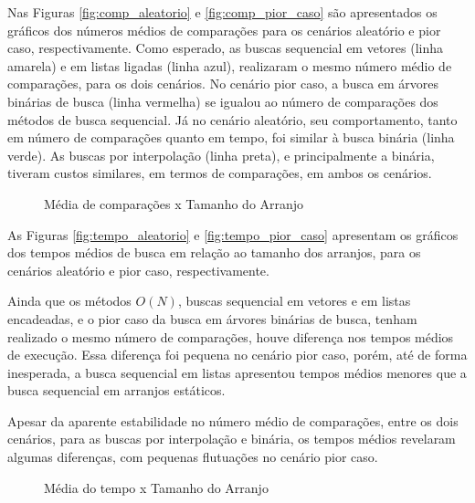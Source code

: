 \documentclass[12pt]{article}
\begin{document}
Nas Figuras \ref{fig:comp_aleatorio} e \ref{fig:comp_pior_caso} são apresentados os gráficos dos números médios de comparações para os cenários aleatório e pior caso, respectivamente. 
Como esperado, as buscas sequencial em vetores (linha amarela) e em listas ligadas (linha azul), realizaram o mesmo número médio de comparações, para os dois cenários.
No cenário pior caso, a busca em árvores binárias de busca (linha vermelha) se igualou ao número de comparações dos métodos de busca sequencial. Já no cenário aleatório, seu comportamento, tanto em número de comparações quanto em tempo, foi similar à busca binária (linha verde).
As buscas por interpolação (linha preta), e principalmente a binária, tiveram custos similares, em termos de comparações, em ambos os cenários.
\begin{figure}[h]
    \caption{Média de comparações x Tamanho do Arranjo}
    \label{fig:comp}
\end{figure}

As Figuras \ref{fig:tempo_aleatorio} e \ref{fig:tempo_pior_caso} apresentam os gráficos dos tempos médios de busca em relação ao tamanho dos arranjos, para os cenários aleatório e pior caso, respectivamente.

Ainda que os métodos $O(N)$, buscas sequencial em vetores e em listas encadeadas, e o pior caso da busca em árvores binárias de busca, tenham realizado o mesmo número de comparações, houve diferença nos tempos médios de execução.
Essa diferença foi pequena no cenário pior caso, porém, até de forma inesperada, a busca sequencial em listas apresentou tempos médios menores que a busca sequencial em arranjos estáticos.

Apesar da aparente estabilidade no número médio de comparações, entre os dois cenários, para as buscas por interpolação e binária, os tempos médios revelaram algumas diferenças, com pequenas flutuações no cenário pior caso.

\begin{figure}[H]
    \caption{Média do tempo x Tamanho do Arranjo}
    \label{fig:tempo}
\end{figure}
\end{document}
